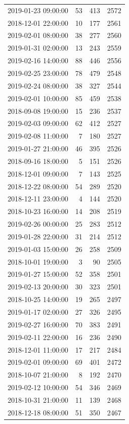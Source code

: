 \begin{tabular}{lrrr}
2019-01-23 09:00:00 & 53 & 413 & 2572 \\
2018-12-01 22:00:00 & 10 & 177 & 2561 \\
2019-02-01 08:00:00 & 38 & 277 & 2560 \\
2019-01-31 02:00:00 & 13 & 243 & 2559 \\
2019-02-16 14:00:00 & 88 & 446 & 2556 \\
2019-02-25 23:00:00 & 78 & 479 & 2548 \\
2019-02-24 08:00:00 & 38 & 327 & 2544 \\
2019-02-01 10:00:00 & 85 & 459 & 2538 \\
2018-09-08 19:00:00 & 15 & 236 & 2537 \\
2019-02-03 09:00:00 & 62 & 412 & 2527 \\
2019-02-08 11:00:00 & 7 & 180 & 2527 \\
2019-01-27 21:00:00 & 46 & 395 & 2526 \\
2018-09-16 18:00:00 & 5 & 151 & 2526 \\
2018-12-01 09:00:00 & 7 & 143 & 2525 \\
2018-12-22 08:00:00 & 54 & 289 & 2520 \\
2018-12-11 23:00:00 & 4 & 144 & 2520 \\
2018-10-23 16:00:00 & 14 & 208 & 2519 \\
2019-02-26 00:00:00 & 25 & 283 & 2512 \\
2019-01-28 22:00:00 & 31 & 214 & 2512 \\
2019-01-03 15:00:00 & 26 & 258 & 2509 \\
2018-10-01 19:00:00 & 3 & 90 & 2505 \\
2019-01-27 15:00:00 & 52 & 358 & 2501 \\
2019-02-13 20:00:00 & 30 & 323 & 2501 \\
2018-10-25 14:00:00 & 19 & 265 & 2497 \\
2019-01-17 02:00:00 & 27 & 326 & 2495 \\
2019-02-27 16:00:00 & 70 & 383 & 2491 \\
2019-02-11 22:00:00 & 16 & 236 & 2490 \\
2018-12-01 11:00:00 & 17 & 217 & 2484 \\
2019-02-01 09:00:00 & 69 & 401 & 2472 \\
2018-10-07 21:00:00 & 8 & 192 & 2470 \\
2019-02-12 10:00:00 & 54 & 346 & 2469 \\
2018-10-31 21:00:00 & 11 & 139 & 2468 \\
2018-12-18 08:00:00 & 51 & 350 & 2467 \\

\end{tabular}
